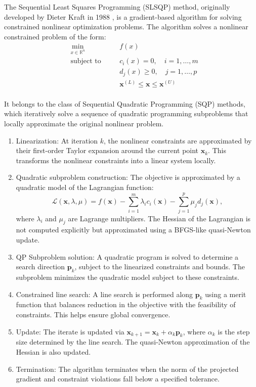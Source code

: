 The Sequential Least Squares Programming (SLSQP) method, originally developed by Dieter Kraft in 1988 \cite{kraft1988slsqp}, is a gradient-based algorithm for solving constrained nonlinear optimization problems.
The algorithm solves a nonlinear constrained problem of the form:
\begin{align*}
& \min_{x \in \mathbb{R}^n} \quad && f(x) \\
& \text{subject to} \quad && c_i(x) = 0, \quad i = 1, \dots, m \\
& && d_j(x) \geq 0, \quad j = 1, \dots, p \\
& && \mathbf{x}^{(L)} \leq \mathbf{x} \leq \mathbf{x}^{(U)}\\
\end{align*}

It belongs to the class of Sequential Quadratic Programming (SQP) methods, which iteratively solve a sequence of quadratic programming subproblems that locally approximate the original nonlinear problem. 
\begin{enumerate}
    \item Linearization: At iteration $k$, the nonlinear constraints are approximated by their first-order Taylor expansion around the current point $\mathbf{x}_k$.
    This transforms the nonlinear constraints into a linear system locally.
    \item Quadratic subproblem construction: The objective is approximated by a quadratic model of the Lagrangian function: \begin{equation}
        \mathcal{L}(\mathbf{x}, \lambda, \mu) = f(\mathbf{x}) - \sum_{i=1}^{m} \lambda_i c_i(\mathbf{x}) - \sum_{j=1}^{p} \mu_j d_j(\mathbf{x}),
    \end{equation}
    where $\lambda_i$ and $\mu_j$ are Lagrange multipliers. 
    The Hessian of the Lagrangian is not computed explicitly but approximated using a BFGS-like quasi-Newton update.
    \item QP Subproblem solution: A quadratic program is solved to determine a search direction $\mathbf{p}_k$, subject to the linearized constraints and bounds. 
    The subproblem minimizes the quadratic model subject to these constraints.
    \item Constrained line search: A line search is performed along $\mathbf{p}_k$ using a merit function that balances reduction in the objective with the feasibility of constraints. 
    This helps ensure global convergence.
    \item Update: The iterate is updated via $\mathbf{x}_{k+1} = \mathbf{x}_k + \alpha_k \mathbf{p}_k$, where $\alpha_k$ is the step size determined by the line search. 
    The quasi-Newton approximation of the Hessian is also updated.
    \item Termination: The algorithm terminates when the norm of the projected gradient and constraint violations fall below a specified tolerance.
\end{enumerate}

